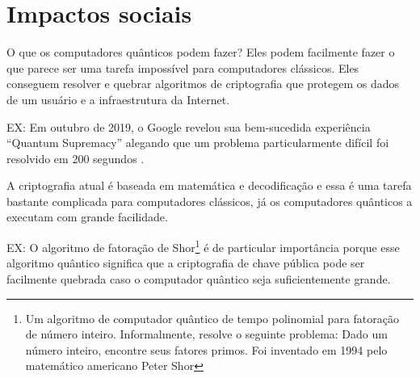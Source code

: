 \section{Impactos sociais}
O que os computadores quânticos podem fazer?  Eles podem facilmente fazer o que parece ser uma tarefa impossível para computadores clássicos. Eles conseguem resolver e quebrar algoritmos de criptografia que protegem os dados de um usuário e a infraestrutura da Internet.  

EX: Em outubro de 2019, o Google revelou sua bem-sucedida experiência ``Quantum Supremacy'' alegando que um problema particularmente difícil foi resolvido em 200 segundos \cite{15}.

A criptografia atual é baseada em matemática e decodificação e essa é uma tarefa bastante complicada para computadores clássicos, já os computadores quânticos a executam com grande facilidade. 

EX: O algoritmo de fatoração de Shor\footnote{Um algoritmo de computador quântico de tempo polinomial para fatoração de número inteiro. Informalmente, resolve o seguinte problema: Dado um número inteiro, encontre seus fatores primos. Foi inventado em 1994 pelo matemático americano Peter Shor} é de particular importância porque esse algoritmo quântico significa que a criptografia de chave pública pode ser facilmente quebrada caso o computador quântico seja suficientemente grande.
\newpage
